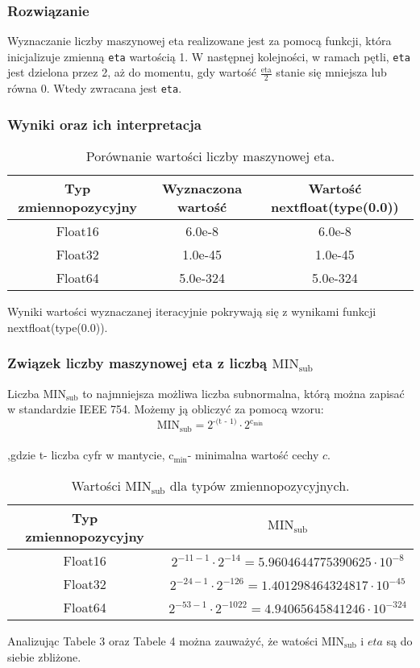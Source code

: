 \documentclass{article}
\begin{document}
\subsubsection{Rozwiązanie}
Wyznaczanie liczby maszynowej eta realizowane jest za pomocą funkcji, która inicjalizuje zmienną \texttt{eta} wartością 1. W następnej kolejności, w ramach pętli, \texttt{eta} jest dzielona przez 2, aż do momentu, gdy wartość \(\frac{\text{eta}}{2}\) stanie się mniejsza lub równa 0. Wtedy zwracana jest \texttt{eta}. 
\subsubsection{Wyniki oraz ich interpretacja}

\begin{table}[H]
\centering
\begin{tabular}{|c|c|c|}
\hline
	Typ zmiennopozycyjny & Wyznaczona wartość  & Wartość nextfloat(type(0.0))\\
\hline
	Float16 & 6.0e-8 & 6.0e-8\\
\hline
	Float32 & 1.0e-45 & 1.0e-45\\
\hline
	Float64 & 5.0e-324 & 5.0e-324\\
\hline
\end{tabular}
\caption{Porównanie wartości liczby maszynowej eta.}
\end{table}
Wyniki wartości wyznaczanej iteracyjnie pokrywają się z wynikami funkcji nextfloat(type(0.0)).
\subsubsection{Związek liczby maszynowej eta z liczbą $\text{MIN}_{\text{sub}}$}
Liczba $\text{MIN}_{\text{sub}}$ to najmniejsza możliwa liczba subnormalna, którą można zapisać w standardzie IEEE 754. Możemy ją obliczyć za pomocą wzoru:
\[
\text{MIN}_{\text{sub}} = 2^{\text{-(t - 1)}} \cdot 2^{\text{c}_{\text{min}}}
\]
\\ ,gdzie t- liczba cyfr w mantycie, $\text{c}_{\text{min}}$- minimalna wartość cechy $c$.
\begin{table}[H]
\centering
\begin{tabular}{|c|c|}
\hline
	Typ zmiennopozycyjny  & $\text{MIN}_{\text{sub}}$ \\
\hline
	Float16 & $2^{-11 - 1} \cdot 2^{-14} = 5.9604644775390625 \cdot 10^{-8}$ \\
\hline
	Float32  &  $2^{-24 - 1} \cdot 2^{-126} = 1.401298464324817 \cdot 10^{-45}$ \\
\hline
	Float64 & $2^{-53 - 1} \cdot 2^{-1022} = 4.94065645841246  \cdot 10^{-324}$ \\
\hline
\end{tabular}
\caption{Wartości $\text{MIN}_{\text{sub}}$ dla typów zmiennopozycyjnych.}
\end{table}
Analizując Tabele 3 oraz Tabele 4 można zauważyć, że watości $\text{MIN}_{\text{sub}}$ i $eta$ są do siebie zbliżone.
\end{document}
